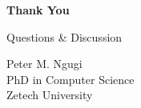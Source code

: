 \documentclass[aspectratio=169,11pt]{beamer}
\begin{document}
	
	\begin{frame}[plain]
		
		\begin{center}
			
			\vspace{1.5cm}
			
			{\Huge
				\color{CyberCyan}
				\textbf{Thank You}
			}
			
			\vspace{0.8cm}
			
			{\Large
				\color{CyberWhite}
				Questions \& Discussion
			}
			
			\vspace{1.2cm}
			
			{\small
				Peter M. Ngugi\\
				PhD in Computer Science\\
				Zetech University
			}
			
		\end{center}
		
	\end{frame}
	
\end{document}
